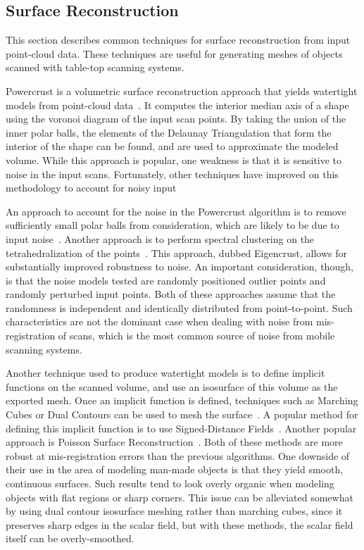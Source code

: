 \documentclass[journal]{IEEEtran}
\begin{document}
\subsection{Surface Reconstruction}
\label{ssec:background_surf_recon}

This section describes common techniques for surface reconstruction from input point-cloud data.  These techniques are useful for generating meshes of objects scanned with table-top scanning systems.

Powercrust is a volumetric surface reconstruction approach that yields watertight models from point-cloud data~\cite{Powercrust}.  It computes the interior median axis of a shape using the voronoi diagram of the input scan points.  By taking the union of the inner polar balls, the elements of the Delaunay Triangulation that form the interior of the shape can be found, and are used to approximate the modeled volume.  While this approach is popular, one weakness is that it is sensitive to noise in the input scans.  Fortunately, other techniques have improved on this methodology to account for noisy input

An approach to account for the noise in the Powercrust algorithm is to remove sufficiently small polar balls from consideration, which are likely to be due to input noise~\cite{NoisyPowercrust}.  Another approach is to perform spectral clustering on the tetrahedralization of the points~\cite{EigencrustShewchuk}.  This approach, dubbed Eigencrust, allows for substantially improved robustness to noise.  An important consideration, though, is that the noise models tested are randomly positioned outlier points and randomly perturbed input points.  Both of these approaches assume that the randomness is independent and identically distributed from point-to-point.  Such characteristics are not the dominant case when dealing with noise from mis-registration of scans, which is the most common source of noise from mobile scanning systems.

Another technique used to produce watertight models is to define implicit functions on the scanned volume, and use an isosurface of this volume as the exported mesh.  Once an implicit function is defined, techniques such as Marching Cubes or Dual Contours can be used to mesh the surface~\cite{MarchingCubes,DualContouring}. A popular method for defining this implicit function is to use Signed-Distance Fields~\cite{SignedDistanceFields}.  Another popular approach is Poisson Surface Reconstruction~\cite{Poisson}.  Both of these methods are more robust at mis-registration errors than the previous algorithms.  One downside of their use in the area of modeling man-made objects is that they yield smooth, continuous surfaces.  Such results tend to look overly organic when modeling objects with flat regions or sharp corners.  This issue can be alleviated somewhat by using dual contour isosurface meshing rather than marching cubes, since it preserves sharp edges in the scalar field, but with these methods, the scalar field itself can be overly-smoothed.
\end{document}
